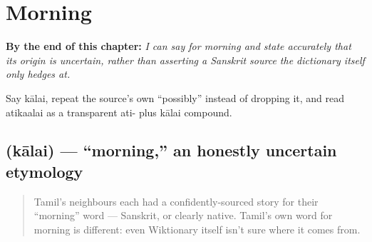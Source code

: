 
\chapter{Morning}
\label{ch:ta-morning}

\begin{chapteropening}
\textbf{By the end of this chapter:} \emph{I can say  for morning and state accurately that its origin is uncertain, rather than asserting a Sanskrit source the dictionary itself only hedges at.}

Say kālai, repeat the source's own \textquotedblleft{}possibly\textquotedblright{} instead of dropping it, and read atikaalai as a transparent ati- plus kālai compound.
\end{chapteropening}

\section[\texorpdfstring{\ta{காலை} (kālai)}{காலை (kālai)}]{ (kālai) — \textquotedblleft{}morning,\textquotedblright{} an honestly uncertain etymology}

\label{lesson:TA-C26-kaalai}



\begin{quote}
Tamil's neighbours each had a confidently-sourced story for their \textquotedblleft{}morning\textquotedblright{} word — Sanskrit, or clearly native. Tamil's own word for morning is different: even Wiktionary itself isn't sure where it comes from.
\end{quote}

